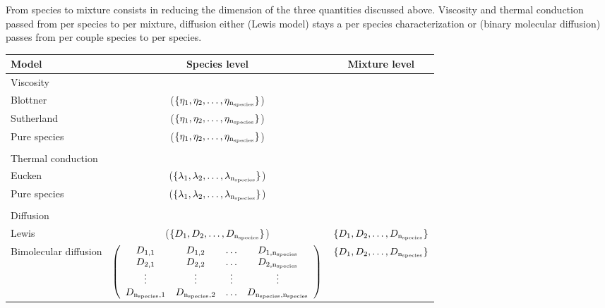 From species to mixture consists in reducing the
dimension of the three quantities discussed above.
Viscosity and thermal conduction passed from
per species to per mixture, diffusion either
(Lewis model) stays a per species characterization
or (binary molecular diffusion) passes from
per couple species to per species.

\noindent
\begin{tabular}{lcc}\toprule
Model  & Species level                                    & Mixture level \\\midrule
\multicolumn{3}{l}{\hspace{\parindent}Viscosity}\\\cmidrule(lr){1-2}
Blottner     & ($\{\vis[1],\vis[2],\dots,\vis[\nspecies]\}$) &  \\
Sutherland   & ($\{\vis[1],\vis[2],\dots,\vis[\nspecies]\}$) &  \\
Pure species & ($\{\vis[1],\vis[2],\dots,\vis[\nspecies]\}$) &  \\\\
\multicolumn{3}{l}{\hspace{\parindent}Thermal conduction}\\\cmidrule(rl){1-2}
Eucken       & ($\{\thermcond[1],\thermcond[2],\dots,\thermcond[\nspecies]\}$) &  \\
Pure species & ($\{\thermcond[1],\thermcond[2],\dots,\thermcond[\nspecies]\}$) &  \\\\
\multicolumn{3}{l}{\hspace{\parindent}Diffusion}\\\cmidrule(lr){1-2}
Lewis                 &  ($\{\diff[1],\diff[2],\dots,\diff[\nspecies]\}$) & $\{\diff[1],\diff[2],\dots,\diff[\nspecies]\}$ \\
Bimolecular diffusion & $\left(\begin{array}{cccc}
                          \diff[1,1]         & \diff[1,2]         & \dots  & \diff[1,\nspecies]\\
                          \diff[2,1]         & \diff[2,2]         & \dots  & \diff[2,\nspecies]\\
                          \vdots             &  \vdots            & \vdots & \vdots \\
                          \diff[\nspecies,1] & \diff[\nspecies,2] & \dots  & \diff[\nspecies,\nspecies]\\
                         \end{array}\right)
                          $ & $\{\diff[1],\diff[2],\dots,\diff[\nspecies]\}$ \\
\bottomrule
\end{tabular}


